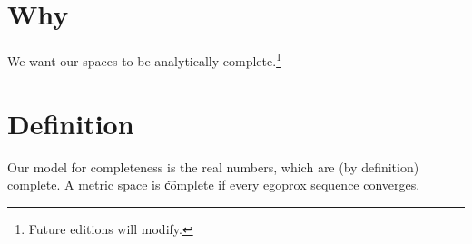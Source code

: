 

\section*{Why}

We want our spaces to be analytically complete.\footnote{Future editions will modify.}

\section*{Definition}

Our model for completeness is the real numbers, which are (by definition) complete.
A metric space is \t{complete} if every egoprox sequence converges.

\blankpage